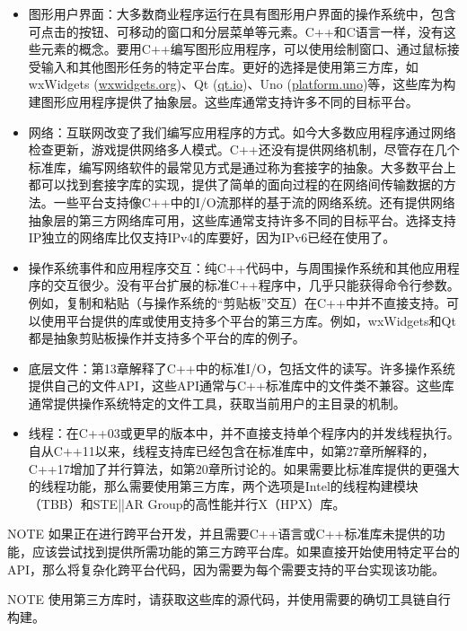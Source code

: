 \begin{itemize}
\item
图形用户界面：大多数商业程序运行在具有图形用户界面的操作系统中，包含可点击的按钮、可移动的窗口和分层菜单等元素。C++和C语言一样，没有这些元素的概念。要用C++编写图形应用程序，可以使用绘制窗口、通过鼠标接受输入和其他图形任务的特定平台库。更好的选择是使用第三方库，如wxWidgets (\url{wxwidgets.org})、Qt (\url{qt.io})、Uno (\url{platform.uno})等，这些库为构建图形应用程序提供了抽象层。这些库通常支持许多不同的目标平台。

\item
网络：互联网改变了我们编写应用程序的方式。如今大多数应用程序通过网络检查更新，游戏提供网络多人模式。C++还没有提供网络机制，尽管存在几个标准库，编写网络软件的最常见方式是通过称为套接字的抽象。大多数平台上都可以找到套接字库的实现，提供了简单的面向过程的在网络间传输数据的方法。一些平台支持像C++中的I/O流那样的基于流的网络系统。还有提供网络抽象层的第三方网络库可用，这些库通常支持许多不同的目标平台。选择支持IP独立的网络库比仅支持IPv4的库要好，因为IPv6已经在使用了。

\item
操作系统事件和应用程序交互：纯C++代码中，与周围操作系统和其他应用程序的交互很少。没有平台扩展的标准C++程序中，几乎只能获得命令行参数。例如，复制和粘贴（与操作系统的“剪贴板”交互）在C++中并不直接支持。可以使用平台提供的库或使用支持多个平台的第三方库。例如，wxWidgets和Qt都是抽象剪贴板操作并支持多个平台的库的例子。

\item
底层文件：第13章解释了C++中的标准I/O，包括文件的读写。许多操作系统提供自己的文件API，这些API通常与C++标准库中的文件类不兼容。这些库通常提供操作系统特定的文件工具，获取当前用户的主目录的机制。

\item
线程：在C++03或更早的版本中，并不直接支持单个程序内的并发线程执行。自从C++11以来，线程支持库已经包含在标准库中，如第27章所解释的，C++17增加了并行算法，如第20章所讨论的。如果需要比标准库提供的更强大的线程功能，那么需要使用第三方库，两个选项是Intel的线程构建模块（TBB）和STE||AR Group的高性能并行X（HPX）库。
\end{itemize}

\begin{myNotic}{NOTE}
如果正在进行跨平台开发，并且需要C++语言或C++标准库未提供的功能，应该尝试找到提供所需功能的第三方跨平台库。如果直接开始使用特定平台的API，那么将复杂化跨平台代码，因为需要为每个需要支持的平台实现该功能。
\end{myNotic}

\begin{myNotic}{NOTE}
使用第三方库时，请获取这些库的源代码，并使用需要的确切工具链自行构建。
\end{myNotic}

















